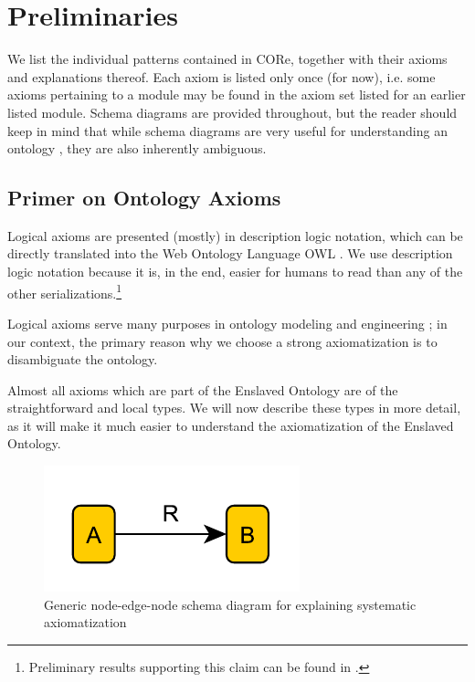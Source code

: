 \chapter{Preliminaries}
\label{sec:pre}
We list the individual patterns contained in CORe, together with their axioms and explanations thereof. Each axiom is listed only once (for now), i.e. some axioms pertaining to a module may be found in the axiom set listed for an earlier listed module. Schema diagrams are provided throughout, but the reader should keep in mind that while schema diagrams are very useful for understanding an ontology \cite{odp-documentation}, they are also inherently ambiguous.

\section*{Primer on Ontology Axioms}

Logical axioms are presented (mostly) in description logic notation, which can be directly translated into the Web Ontology Language OWL \cite{FOST}. We use description logic notation because it is, in the end, easier for humans to read than any of the other serializations.\footnote{Preliminary results supporting this claim can be found in \cite{ShimizuMS}.} 

Logical axioms serve many purposes in ontology modeling and engineering \cite{HitzlerK16};  in our context, the primary reason why we choose a strong axiomatization is to disambiguate the ontology.

Almost all axioms which are part of the Enslaved Ontology are of the straightforward and local types. We will now describe these types in more detail, as it will make it much easier to understand the axiomatization of the Enslaved Ontology.

\bigskip

\begin{figure}[tb]
\begin{center}
\includegraphics[width=.3\textwidth]{figures/02-ARB}
\caption{Generic node-edge-node schema diagram for explaining systematic axiomatization}\label{fig:rec-ARB}
\end{center}
\end{figure}

